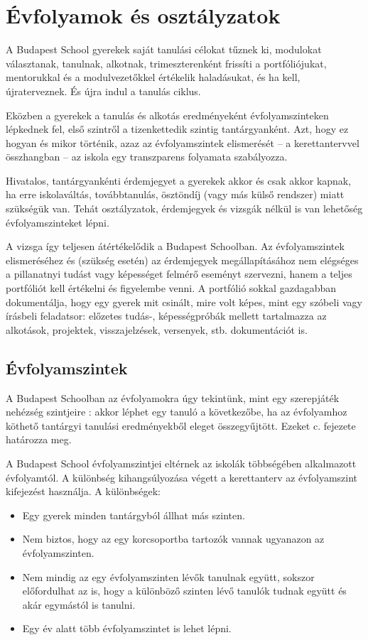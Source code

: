 \section{Évfolyamok és osztályzatok}
A Budapest School gyerekek saját tanulási célokat tűznek ki, modulokat
választanak, tanulnak, alkotnak, trimeszterenként frissíti a portfóliójukat,
mentorukkal és a modulvezetőkkel értékelik haladásukat, és ha kell,
újraterveznek. És újra indul a tanulás ciklus.

Eközben a gyerekek a tanulás és alkotás eredményeként évfolyamszinteken
lépkednek fel,
első szintről a tizenkettedik szintig tantárgyanként.
Azt, hogy ez hogyan és mikor történik, azaz az évfolyamszintek elismerését -- a
kerettantervvel összhangban -- az iskola egy transzparens folyamata
szabályozza.

Hivatalos, tantárgyankénti érdemjegyet a gyerekek akkor és csak akkor kapnak,
ha erre iskolaváltás, továbbtanulás, ösztöndíj	    (vagy más külső rendszer)
miatt szükségük van.
Tehát osztályzatok, érdemjegyek és vizsgák nélkül is van lehetőség
évfolyamszinteket lépni.

A vizsga így teljesen átértékelődik a Budapest Schoolban.
Az évfolyamszintek elismeréséhez és (szükség esetén) az érdemjegyek
megállapításához
nem elégséges a pillanatnyi tudást vagy képességet felmérő eseményt szervezni,
hanem
a teljes portfóliót kell értékelni és figyelembe venni.
A portfólió sokkal gazdagabban dokumentálja, hogy egy gyerek mit csinált, mire
volt képes, mint egy szóbeli vagy írásbeli feladatsor: előzetes tudás-,
képességpróbák
mellett tartalmazza az alkotások, projektek, visszajelzések, versenyek, stb.
dokumentációt is.

\subsection{Évfolyamszintek}
\label{sec:evfolyamok}

A Budapest Schoolban az évfolyamokra úgy tekintünk, mint egy szerepjáték
nehézség
szintjeire \citep{wiki:game_levels}: akkor léphet egy tanuló a következőbe, ha
az
évfolyamhoz köthető tantárgyi tanulási eredményekből eleget összegyűjtött.
Ezeket  c. fejezete határozza meg.

A Budapest School évfolyamszintjei eltérnek az iskolák többségében alkalmazott
évfolyamtól. A különbség kihangsúlyozása végett a kerettanterv az évfolyamszint
kifejezést használja. A különbségek:

\begin{itemize}
      \item Egy gyerek minden tantárgyból állhat más szinten.
      \item Nem biztos, hogy az egy korcsoportba tartozók vannak ugyanazon az
            évfolyamszinten.
      \item Nem mindig az egy évfolyamszinten lévők tanulnak együtt, sokszor
            előfordulhat az is, hogy a különböző szinten lévő tanulók tudnak
            együtt és akár egymástól is tanulni.
      \item Egy év alatt több évfolyamszintet is lehet lépni.
\end{itemize}


